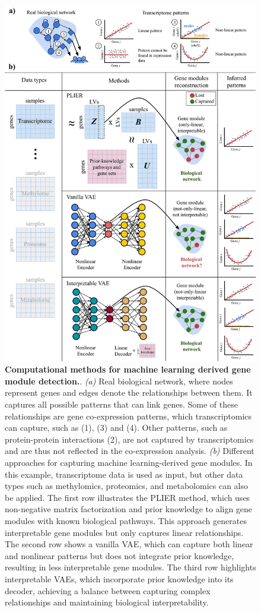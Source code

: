 \begin{figure}
\hypertarget{fig:fig3}{%
\centering
\includegraphics[width=1\textwidth,height=\textheight]{images/fig3.svg}
\caption{\textbf{Computational methods for machine learning derived gene module detection.}.
\emph{(a)} Real biological network, where nodes represent genes and edges denote the relationships between them.
It captures all possible patterns that can link genes.
Some of these relationships are gene co-expression patterns, which transcriptomics can capture, such as (1), (3) and (4).
Other patterns, such as protein-protein interactions (2), are not captured by transcriptomics and are thus not reflected in the co-expression analysis.
\emph{(b)} Different approaches for capturing machine learning-derived gene modules.
In this example, transcriptome data is used as input, but other data types such as methylomics, proteomics, and metabolomics can also be applied.
The first row illustrates the PLIER method, which uses non-negative matrix factorization and prior knowledge to align gene modules with known biological pathways.
This approach generates interpretable gene modules but only captures linear relationships.
The second row shows a vanilla VAE, which can capture both linear and nonlinear patterns but does not integrate prior knowledge, resulting in less interpretable gene modules.
The third row highlights interpretable VAEs, which incorporate prior knowledge into its decoder, achieving a balance between capturing complex relationships and maintaining biological interpretability.}\label{fig:fig3}
}
\end{figure}

